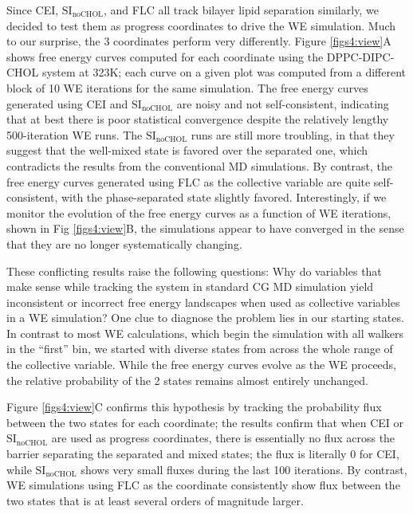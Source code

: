 \documentclass{biophys-new}
\begin{document}
Since CEI, $\text{SI}_{\text{noCHOL}}$, and FLC all track bilayer lipid separation similarly,
we decided to test them as progress coordinates to drive the WE simulation.
Much to our surprise, the 3 coordinates perform very differently.
Figure \ref{figs4:view}A shows free energy curves computed for each coordinate using the DPPC-DIPC-CHOL system at 323K; each curve on a given plot was computed from a different block of 10 WE iterations for the same simulation. The free energy curves generated using CEI and $\text{SI}_{\text{noCHOL}}$ are noisy and not self-consistent, indicating that at best there is poor statistical convergence despite the relatively lengthy 500-iteration WE runs. The $\text{SI}_{\text{noCHOL}}$ runs are still more troubling, in that they suggest that the well-mixed state is favored over the separated one, which contradicts the results from the conventional MD simulations. By contrast, the free energy curves generated using FLC as the collective variable are quite self-consistent, with the phase-separated state slightly favored.
Interestingly, if we monitor the evolution of the free energy curves as a function of WE iterations, shown in Fig \ref{figs4:view}B, the simulations appear to have converged in the sense that they are no longer systematically changing.

These conflicting results raise the following questions: Why do variables that make sense while tracking the system in standard CG MD simulation yield inconsistent or incorrect free energy landscapes when used as collective variables in a  WE simulation?  One clue to diagnose the problem lies in our starting states. In contrast to most WE calculations, which begin the simulation with all walkers in the ``first'' bin, we started with diverse states from across the whole range of the collective variable. While the free energy curves evolve as the WE proceeds, the relative probability of the 2 states remains almost entirely unchanged.

Figure \ref{figs4:view}C confirms this hypothesis by tracking the probability flux between the two states for each coordinate; the results confirm that when CEI or $\text{SI}_{\text{noCHOL}}$ are used as progress coordinates, there is essentially no flux across the barrier separating the separated and mixed states; the flux is literally 0 for CEI, while $\text{SI}_{\text{noCHOL}}$ shows very small fluxes during the last 100 iterations. By contrast, WE simulations using FLC as the coordinate consistently show flux between the two states that is at least several orders of magnitude larger.
\end{document}
